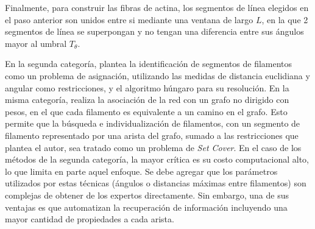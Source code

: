Finalmente, para construir las fibras de actina, los segmentos de l\'inea elegidos en el paso anterior son unidos entre si mediante una ventana de largo $L$, en la que 2 segmentos de l\'inea se superpongan y no tengan una diferencia entre sus \'angulos mayor al umbral $T_{\theta}$. 



\smallskip
En la segunda categor\'ia, \cite{cerda2014geometrical} plantea la identificaci\'on de segmentos de filamentos como un problema de asignaci\'on, utilizando las medidas de distancia euclidiana y angular como restricciones, y el algoritmo h\'ungaro para su resoluci\'on. En la misma categor\'ia, \cite{breuer2015define} realiza la asociaci\'on de la red con un grafo no dirigido con pesos, en el que cada filamento es equivalente a un camino en el grafo. Esto permite que la b\'usqueda e individualizaci\'on de filamentos, con un segmento de filamento representado por una arista del grafo, sumado a las restricciones que plantea el autor, sea tratado como un problema de {\it Set Cover}. En el caso de los m\'etodos de la segunda categor\'ia, la mayor cr\'itica es su costo computacional alto, lo que limita en parte aquel enfoque. Se debe agregar que los par\'ametros utilizados por estas t\'ecnicas (\'angulos o  distancias m\'aximas entre filamentos) son complejas de obtener de los expertos directamente. Sin embargo, una de sus ventajas es que automatizan la recuperaci\'on de informaci\'on incluyendo una mayor cantidad de propiedades a cada arista. 



\medskip

